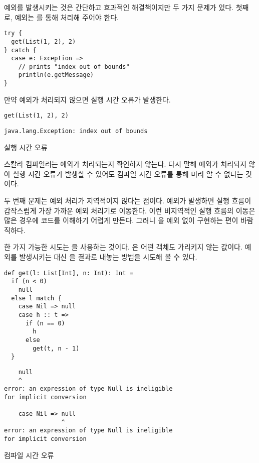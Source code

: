 예외를 발생시키는 것은 간단하고 효과적인 해결책이지만 두 가지 문제가 있다.
첫째로, 예외는 를 통해 처리해 주어야 한다.

\begin{verbatim}
try {
  get(List(1, 2), 2)
} catch {
  case e: Exception =>
    // prints "index out of bounds"
    println(e.getMessage)
}
\end{verbatim}

만약 예외가 처리되지 않으면 실행 시간 오류가 발생한다.

\begin{verbatim}
get(List(1, 2), 2)
\end{verbatim}
\vspace{-1em}
\begin{mdframed}[hidealllines=true,backgroundcolor=gray!10,innerleftmargin=3pt,innerrightmargin=3pt,leftmargin=-3pt,rightmargin=-3pt]
\begin{verbatim}
java.lang.Exception: index out of bounds
\end{verbatim}
\vspace{-2em}
\begin{flushright}
\scriptsize\textsf{실행 시간 오류}
\end{flushright}
\end{mdframed}

스칼라 컴파일러는 예외가 처리되는지 확인하지 않는다. 다시 말해 예외가 처리되지
않아 실행 시간 오류가 발생할 수 있어도 컴파일 시간 오류를 통해 미리 알 수 없다는
것이다.

두 번째 문제는 예외 처리가 지역적이지 않다는 점이다. 예외가 발생하면 실행 흐름이
갑작스럽게 가장 가까운 예외 처리기로 이동한다. 이런 비지역적인 실행 흐름의
이동은 많은 경우에 코드를 이해하기 어렵게 만든다. 그러니 을 예외 없이
구현하는 편이 바람직하다.

한 가지 가능한 시도는 을 사용하는 것이다. 은 어떤 객체도
가리키지 않는 값이다. 예외를 발생시키는 대신 을 결과로 내놓는 방법을
시도해 볼 수 있다.

\begin{verbatim}
def get(l: List[Int], n: Int): Int =
  if (n < 0)
    null
  else l match {
    case Nil => null
    case h :: t =>
      if (n == 0)
        h
      else
        get(t, n - 1)
  }
\end{verbatim}
\vspace{-1em}
\begin{mdframed}[hidealllines=true,backgroundcolor=gray!10,innerleftmargin=3pt,innerrightmargin=3pt,leftmargin=-3pt,rightmargin=-3pt]
\begin{verbatim}
    null
    ^
error: an expression of type Null is ineligible
for implicit conversion

    case Nil => null
                ^
error: an expression of type Null is ineligible
for implicit conversion
\end{verbatim}
\vspace{-2em}
\begin{flushright}
\scriptsize\textsf{컴파일 시간 오류}
\end{flushright}
\end{mdframed}

